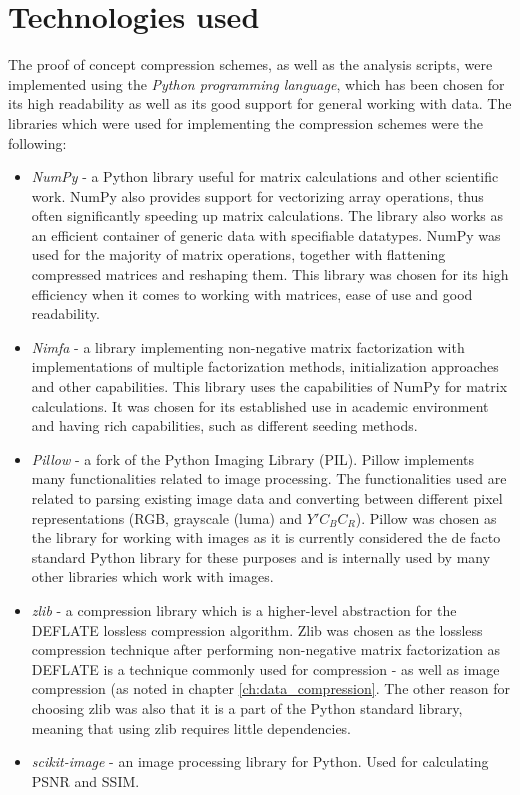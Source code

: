 \documentclass[thesis=M,english]{FITthesis}[2012/10/20]
\begin{document}
\section{Technologies used}
The proof of concept compression schemes, as well as the analysis scripts, were implemented
using the \emph{Python programming language}, which has been chosen for its high readability
as well as its good support for general working with data. The libraries which were used for
implementing the compression schemes were the following:
\begin{itemize}
  \item \emph{NumPy} - a Python library useful for matrix calculations and other scientific work.
        NumPy also provides support for vectorizing array operations, thus often significantly
        speeding up matrix calculations. The library also works as an efficient container of
        generic data with specifiable datatypes. NumPy was used for the majority of matrix
        operations, together with flattening compressed matrices and reshaping them. This library
        was chosen for its high efficiency when it comes to working with matrices, ease of use
        and good readability.\cite{numpy}
  \item \emph{Nimfa} - a library implementing non-negative matrix factorization
        with implementations of multiple factorization methods, initialization
        approaches and other capabilities. This library uses the capabilities of NumPy
        for matrix calculations. It was chosen for its established use in academic
        environment and having rich capabilities, such as different seeding methods.\cite{nimfa}
  \item \emph{Pillow} - a fork of the Python Imaging Library (PIL).
        Pillow implements many functionalities related to image processing. The
        functionalities used are related to parsing existing image data and converting
        between different pixel representations (RGB, grayscale (luma) and $Y'C_BC_R$).
        Pillow was chosen as the library for working with images as it is currently
        considered the de facto standard Python library for these purposes and is internally
        used by many other libraries which work with images.\cite{pillow}
  \item \emph{zlib} - a compression library which is a higher-level abstraction for the DEFLATE
        lossless compression algorithm. Zlib was chosen as the lossless compression
        technique after performing non-negative matrix factorization as DEFLATE is a technique commonly
        used for compression - as well as image compression (as noted in chapter \ref{ch:data_compression}.
        The other reason for choosing zlib was also that it is
	a part of the Python standard library, meaning that using zlib requires little
        dependencies.
  \item \emph{scikit-image} - an image processing library for Python. Used for
        calculating PSNR and SSIM.\cite{scikit-image}
\end{itemize}
\end{document}

